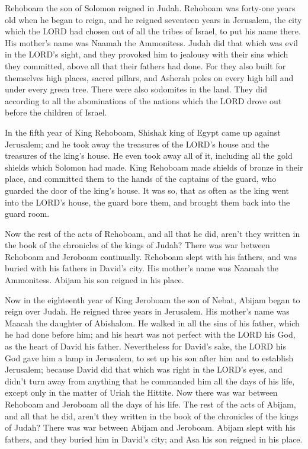 \myverse{}Rehoboam the son of Solomon reigned in Judah. Rehoboam was forty-one
years old when he began to reign, and he reigned seventeen years in Jerusalem, the city which the LORD
had chosen out of all the tribes of Israel, to put his name there. His mother’s name was Naamah the Ammonitess.
\myverse{}Judah did that which was evil in the LORD’s sight, and they provoked him
to jealousy with their sins which they committed, above all that their fathers had done.
\myverse{}For they also built for themselves high places, sacred pillars, and Asherah
poles on every high hill and under every green tree.
\myverse{}There were also sodomites in the land. They did according to all the abominations
of the nations which the LORD drove out before the children of Israel.

\myverse{}In the fifth year of King Rehoboam, Shishak king of Egypt came
up against Jerusalem;
\myverse{}and he took away the treasures of the LORD’s house and the treasures of the
king’s house. He even took away all of it, including all the gold shields which Solomon had made.
\myverse{}King Rehoboam made shields of bronze in their place, and committed them to
the hands of the captains of the guard, who guarded the door of the king’s house.
\myverse{}It was so, that as often as the king went into the LORD’s house, the guard
bore them, and brought them back into the guard room.

\myverse{}Now the rest of the acts of Rehoboam, and all that he did, aren’t
they written in the book of the chronicles of the kings of Judah?
\myverse{}There was war between Rehoboam and Jeroboam continually.
\myverse{}Rehoboam slept with his fathers, and was buried with his fathers in David’s
city. His mother’s name was Naamah the Ammonitess. Abijam his son reigned in his place.


\mychapter{} \myverse*{}Now in the eighteenth year of King Jeroboam the son of Nebat,
Abijam began to reign over Judah.
\myverse{}He reigned three years in Jerusalem. His mother’s name was Maacah the daughter
of Abishalom.
\myverse{}He walked in all the sins of his father, which he had done before him; and
his heart was not perfect with the LORD his God, as the heart of David his father.
\myverse{}Nevertheless for David’s sake, the LORD his God gave him a lamp in Jerusalem,
to set up his son after him and to establish Jerusalem;
\myverse{}because David did that which was right in the LORD’s eyes, and didn’t turn
away from anything that he commanded him all the days of his life, except only in the matter of Uriah
the Hittite.
\myverse{}Now there was war between Rehoboam and Jeroboam all the days of his life.
\myverse{}The rest of the acts of Abijam, and all that he did, aren’t they written in
the book of the chronicles of the kings of Judah? There was war between Abijam and Jeroboam.
\myverse{}Abijam slept with his fathers, and they buried him in David’s city; and Asa
his son reigned in his place.

